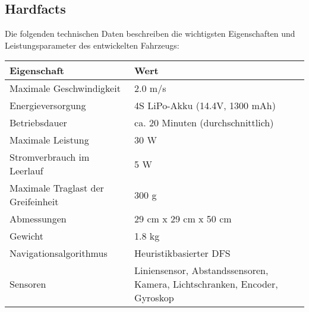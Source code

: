 \documentclass[main.tex]{subfiles} %
\begin{document}

\subsection{Hardfacts}

Die folgenden technischen Daten beschreiben die wichtigsten Eigenschaften und
Leistungsparameter des entwickelten Fahrzeugs:

\begin{table}[h!]
    \centering
    \renewcommand{\arraystretch}{1.5}
    \begin{tabular}{|l|p{7cm}|}
        \hline
        \textbf{Eigenschaft}               & \textbf{Wert}                                                             \\ \hline
        Maximale Geschwindigkeit           & 2.0 m/s                                                                   \\ \hline
        Energieversorgung                  & 4S LiPo-Akku (14.4V, 1300 mAh)                                            \\ \hline
        Betriebsdauer                      & ca. 20 Minuten (durchschnittlich)                                         \\ \hline
        Maximale Leistung                  & 30 W                                                                      \\ \hline %
        Stromverbrauch im Leerlauf         & 5 W                                                                       \\ \hline %
        Maximale Traglast der Greifeinheit & 300 g                                                                     \\ \hline %
        Abmessungen                        & 29 cm x 29 cm x 50 cm                                                     \\ \hline
        Gewicht                            & 1.8 kg                                                                    \\ \hline
        Navigationsalgorithmus             & Heuristikbasierter DFS                                                    \\ \hline
        Sensoren                           & Liniensensor, Abstandssensoren, Kamera, Lichtschranken, Encoder, Gyroskop \\ \hline

\end{tabular}
\end{table}
\end{document}
